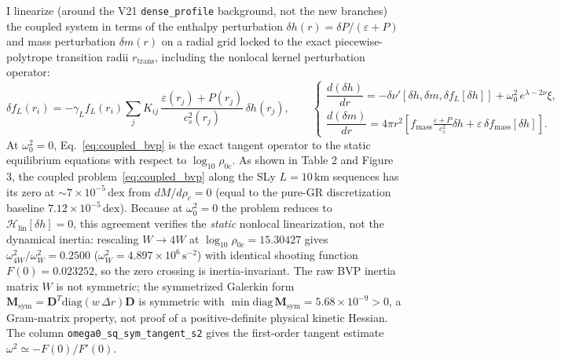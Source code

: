 \documentclass[10pt,a4paper]{article}
\begin{document}
I linearize (around the V21 \texttt{dense\_profile} background, not the new branches) the coupled system in terms of the enthalpy perturbation $\delta h(r) = \delta P/(\varepsilon+P)$ and mass perturbation $\delta m(r)$ on a radial grid locked to the exact piecewise-polytrope transition radii $r_{\text{trans}}$, including the nonlocal kernel perturbation operator:
\begin{equation}
  \delta f_L(r_i) = -\gamma_L f_L(r_i)\sum_j K_{ij}\,\frac{\varepsilon(r_j)+P(r_j)}{c_s^2(r_j)}\,\delta h(r_j), \qquad
  \begin{cases}
    \dfrac{d(\delta h)}{dr} = -\delta\nu'\!\left[\delta h, \delta m, \delta f_L[\delta h]\right] + \omega_0^2\,e^{\lambda-2\nu}\xi, \\[4pt]
    \dfrac{d(\delta m)}{dr} = 4\pi r^2\!\left[f_{\text{mass}}\frac{\varepsilon+P}{c_s^2}\delta h + \varepsilon\,\delta f_{\text{mass}}[\delta h]\right].
  \end{cases} \label{eq:coupled_bvp}
\end{equation}
At $\omega_0^2 = 0$, Eq.~\eqref{eq:coupled_bvp} is the exact tangent operator to the static equilibrium equations with respect to $\log_{10}\rho_{0c}$. As shown in Table 2 and Figure 3, the coupled problem~\eqref{eq:coupled_bvp} along the SLy $L=10\,\text{km}$ sequences has its zero at $\sim 7\times 10^{-5}\,\text{dex}$ from $dM/d\rho_c=0$ (equal to the pure-GR discretization baseline $7.12\times 10^{-5}\,\text{dex}$). Because at $\omega_0^2=0$ the problem reduces to $\mathcal{H}_{\text{lin}}[\delta h]=0$, this agreement verifies the \emph{static} nonlocal linearization, not the dynamical inertia: rescaling $W\to 4W$ at $\log_{10}\rho_{0c}=15.30427$ gives $\omega^2_{4W}/\omega^2_W = 0.2500$ ($\omega^2_W=4.897\times 10^{6}\,\text{s}^{-2}$) with identical shooting function $F(0)=0.023252$, so the zero crossing is inertia-invariant. The raw BVP inertia matrix $W$ is not symmetric; the symmetrized Galerkin form $\mathbf{M}_{\text{sym}} = \mathbf{D}^{T}\mathrm{diag}(w\,\Delta r)\mathbf{D}$ is symmetric with $\min\mathrm{diag}\,\mathbf{M}_{\text{sym}} = 5.68\times 10^{-9}>0$, a Gram-matrix property, not proof of a positive-definite physical kinetic Hessian. The column \texttt{omega0\_sq\_sym\_tangent\_s2} gives the first-order tangent estimate $\omega^2\simeq -F(0)/F'(0)$.
\end{document}
